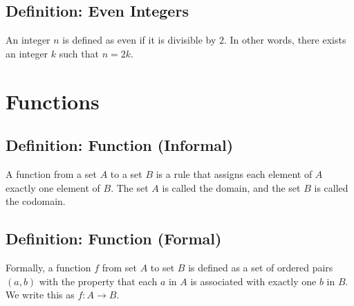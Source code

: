 \subsection*{Definition: Even Integers}
An integer \(n\) is defined as even if it is divisible by \(2\). In other words, there exists an integer \(k\) such that \(n = 2k\).


\section*{Functions}

\subsection*{Definition: Function (Informal)}
A function from a set \(A\) to a set \(B\) is a rule that assigns each element of \(A\) exactly one element of \(B\). The set \(A\) is called the domain, and the set \(B\) is called the codomain.

\subsection*{Definition: Function (Formal)}
Formally, a function \(f\) from set \(A\) to set \(B\) is defined as a set of ordered pairs \((a, b)\) with the property that each \(a\) in \(A\) is associated with exactly one \(b\) in \(B\). We write this as \(f: A \to B\).



